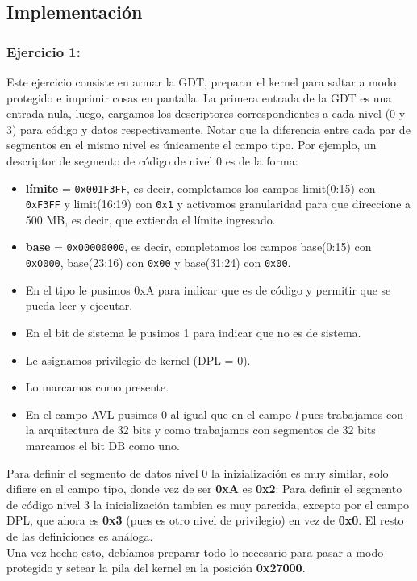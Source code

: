 \subsection{Implementación}
\subsubsection{Ejercicio 1: }

Este ejercicio consiste en armar la GDT, preparar el kernel para saltar a modo protegido e imprimir
cosas en pantalla.
La primera entrada de la GDT es una entrada nula, luego, cargamos los descriptores correspondientes a cada nivel (0 y 3) para código y datos respectivamente. Notar que la diferencia entre cada par
de segmentos en el mismo nivel es únicamente el campo tipo. Por ejemplo, un descriptor de segmento
de código de nivel 0 es de la forma:
\begin{itemize}
	\item \textbf{límite} = \texttt{0x001F3FF}, es decir, completamos los campos limit(0:15) con \texttt{0xF3FF} y limit(16:19) con \texttt{0x1} y activamos granularidad para que direccione a 500 MB, es decir, que extienda el límite ingresado.
	\item \textbf{base} = \texttt{0x00000000}, es decir, completamos los campos base(0:15) con \texttt{0x0000}, base(23:16) con
\texttt{0x00} y base(31:24) con \texttt{0x00}.
	\item En el tipo le pusimos 0xA para indicar que es de código y permitir que se pueda leer y ejecutar.
	\item En el bit de sistema le pusimos 1 para indicar que no es de sistema.
	\item Le asignamos privilegio de kernel (DPL = 0).
	\item Lo marcamos como presente.
	\item En el campo AVL pusimos 0 al igual que en el campo \textit{l} pues trabajamos con la arquitectura de 32 bits y como trabajamos con segmentos de 32 bits marcamos el bit DB como uno.
\end{itemize}
Para definir el segmento de datos nivel 0 la inizialización es muy similar, solo difiere en el campo tipo, donde vez de ser \textbf{0xA} es \textbf{0x2}:
Para definir el segmento de código nivel 3 la inicialización tambien es muy parecida, excepto por el
campo DPL, que ahora es \textbf{0x3} (pues es otro nivel de privilegio) en vez de \textbf{0x0}.
El resto de las definiciones es análoga. \\
Una vez hecho esto, debíamos preparar todo lo necesario para pasar a modo protegido y setear la pila del kernel en la posición \textbf{0x27000}.
